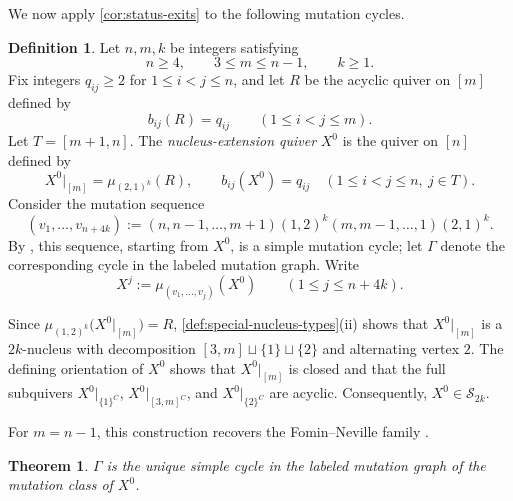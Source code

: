 \documentclass[10pt,a4paper]{amsart}
\newtheorem{theorem}{Theorem}[section]
\theoremstyle{definition}
\newtheorem{definition}[definition]{Definition}
\theoremstyle{definition}
\numberwithin{equation}{section}
\numberwithin{table}{section}
\newcommand{\Sclass}{\mathcal{S}}
\newcommand{\Xj}[1]{X^{#1}}
\begin{document}
We now apply \cref{cor:status-exits} to the following mutation cycles.

\begin{definition}\label{def:nucleus-extension-quiver}
Let $n,m,k$ be integers satisfying
\begin{equation}\label{eq:parameters}
 n\geq4,\qquad 3\leq m\leq n-1,\qquad k\geq1.
\end{equation}
Fix integers $q_{ij}\geq2$ for $1\leq i<j\leq n$, and let $R$ be the
acyclic quiver on $[m]$ defined by
\begin{equation}\label{eq:reference-R}
 b_{ij}(R)=q_{ij}\qquad(1\leq i<j\leq m).
\end{equation}
Let $T=[m+1,n]$. The \emph{nucleus-extension quiver} $\Xj{0}$ is the
quiver on $[n]$ defined by
\begin{equation}\label{eq:nucleus-extension-quiver}
 \Xj{0}|_{[m]}=\mu_{(2,1)^k}(R),\qquad
 b_{ij}(\Xj{0})=q_{ij}\quad(1\leq i<j\leq n,\ j\in T).
\end{equation}
Consider the mutation sequence
\[
 (v_1,\ldots,v_{n+4k})
 :=(n,n-1,\ldots,m+1)(1,2)^k(m,m-1,\ldots,1)(2,1)^k.
\]
By \cite[Theorem~4.24]{EN26}, this sequence, starting from $\Xj{0}$, is a
simple mutation cycle; let $\Gamma$ denote the corresponding cycle in the
labeled mutation graph. Write
\begin{equation}\label{eq:cycle-quivers}
 \Xj{j}:=\mu_{(v_1,\ldots,v_j)}(\Xj{0})
 \qquad(1\leq j\leq n+4k).
\end{equation}
\end{definition}

Since $\mu_{(1,2)^k}\bigl(\Xj{0}|_{[m]}\bigr)=R$,
\cref{def:special-nucleus-types}\textup{(ii)} shows that
$\Xj{0}|_{[m]}$ is a $2k$-nucleus with decomposition
$[3,m]\sqcup\{1\}\sqcup\{2\}$ and alternating vertex $2$.
The defining orientation of
$\Xj{0}$ shows that $\Xj{0}|_{[m]}$ is closed and that the full subquivers
$\Xj{0}|_{\{1\}^C}$, $\Xj{0}|_{[3,m]^C}$, and $\Xj{0}|_{\{2\}^C}$ are
acyclic. Consequently, $\Xj{0}\in\Sclass_{2k}$.

For $m=n-1$, this construction recovers the Fomin--Neville family
\cite[Theorem~1.1]{FN25}.

\begin{theorem}\label{thm:main}
$\Gamma$ is the unique simple cycle in the labeled mutation graph of the
mutation class of $\Xj{0}$.
\end{theorem}
\end{document}
